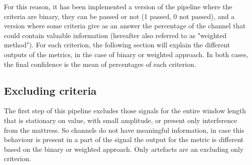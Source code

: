 For this reason, it has been implemented a version of the pipeline where the criteria are binary, they can be passed or not (1 passed, 0 not passed), and a version where some criteria give as an answer the percentage of the channel that could contain valuable information (hereafter also referred to as "weighted method"). For each criterion, the following section will explain the different outputs of the metrics, in the case of binary or weighted approach.
In both cases, the final confidence is the mean of percentages of each criterion.

\subsection{Excluding criteria}\label{cap:excCrit}
The first step of this pipeline excludes those signals for the entire window length that is stationary on value, with small amplitude, or present only interference from the mattress. So channels do not have meaningful information, in case this behaviour is present in a part of the signal the output for the metric is different based on the binary or weighted approach. Only artefacts are an excluding only criterion.

